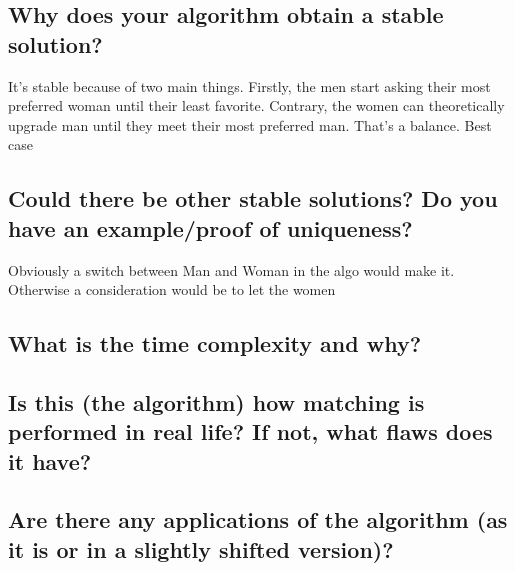 \documentclass{article}
\begin{document}
  \subsection{Why does your algorithm obtain a stable solution?}
  It's stable because of two main things. Firstly, the men start asking their most preferred woman until their least favorite. Contrary, the women can theoretically upgrade man until they meet their most preferred man. That's a balance. Best case 
  \subsection{Could there be other stable solutions? Do you have an example/proof of uniqueness?}
  Obviously a switch between Man and Woman in the algo would make it.
  Otherwise a consideration would be to let the women 
  \subsection{What is the time complexity and why?}
  \subsection{Is this (the algorithm) how matching is performed in real life? If not, what flaws does it have?}
  \subsection{Are there any applications of the algorithm (as it is or in a slightly shifted version)?}
\end{document}
